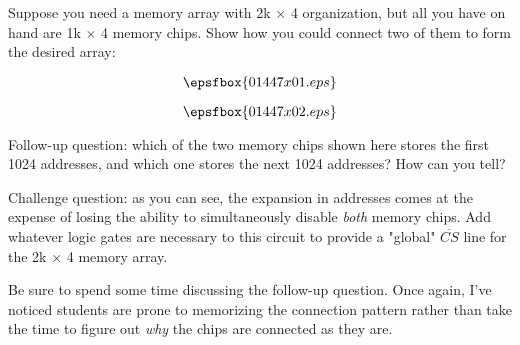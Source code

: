 

Suppose you need a memory array with 2k $\times$ 4 organization, but all you have on hand are 1k $\times$ 4 memory chips.  Show how you could connect two of them to form the desired array:

$$\epsfbox{01447x01.eps}$$







$$\epsfbox{01447x02.eps}$$

\vskip 10pt

Follow-up question: which of the two memory chips shown here stores the first 1024 addresses, and which one stores the next 1024 addresses?  How can you tell?

\vskip 10pt

Challenge question: as you can see, the expansion in addresses comes at the expense of losing the ability to simultaneously disable {\it both} memory chips.  Add whatever logic gates are necessary to this circuit to provide a "global" $\overline{CS}$ line for the 2k $\times$ 4 memory array.







Be sure to spend some time discussing the follow-up question.  Once again, I've noticed students are prone to memorizing the connection pattern rather than take the time to figure out {\it why} the chips are connected as they are.




